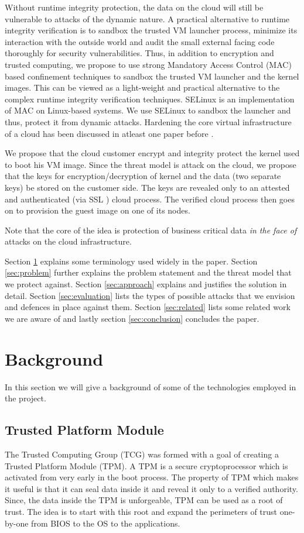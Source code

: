 \documentclass[10pt,twocolumn,pdftex]{article}
\begin{document}
Without runtime integrity protection, the data on the cloud will still be vulnerable to attacks of the dynamic nature. A practical alternative to runtime integrity verification is to sandbox the trusted VM launcher process, minimize its interaction with the outside world and audit the small external facing code thoroughly for security vulnerabilities. Thus, in addition to encryption and trusted computing, we propose to use strong Mandatory Access Control (MAC) based confinement techniques to sandbox the trusted VM launcher and the kernel images. This can be viewed as a light-weight and practical alternative to the complex runtime integrity verification techniques. SELinux \cite{SELinux} is an implementation of MAC on Linux-based systems. We use SELinux to sandbox the launcher and thus, protect it from dynamic attacks. Hardening the core virtual infrastructure of a cloud has been discussed in atleast one paper before \cite{secure-cloud-core}. 

We propose that the cloud customer encrypt and integrity protect the kernel used to boot his VM image. Since the threat model is attack on the cloud, we propose that the keys for encryption/decryption of kernel and the data (two separate keys) be stored on the customer side. The keys are revealed only to an attested and authenticated (via SSL \cite{SSL}) cloud process. The verified cloud process then goes on to provision the guest image on one of its nodes.

Note that the core of the idea is protection of business critical data \emph{in the face of} attacks on the cloud infrastructure.

Section \ref{sec:background} explains some terminology used widely in the paper. Section \ref{sec:problem} further explains the problem statement and the threat model that we protect against. Section \ref{sec:approach} explains and justifies the solution in detail. Section \ref{sec:evaluation} lists the types of possible attacks that we envision and defences in place against them. Section \ref{sec:related} lists some related work we are aware of and lastly section \ref{sec:conclusion} concludes the paper.

\section{Background}
\label{sec:background}
In this section we will give a background of some of the technologies employed in the project.

\subsection{Trusted Platform Module}
The Trusted Computing Group (TCG) \cite{TCG} was formed with a goal of creating a Trusted Platform Module (TPM). A TPM is a secure cryptoprocessor which is activated from very early in the boot process. The property of TPM which makes it useful is that it can seal data inside it and reveal it only to a verified authority. Since, the data inside the TPM is unforgeable, TPM can be used as a root of trust. The idea is to start with this root and expand the perimeters of trust one-by-one from BIOS to the OS to the applications.
\end{document}
